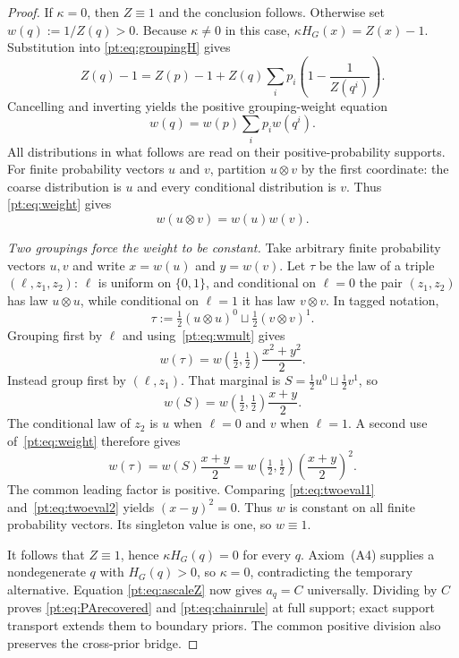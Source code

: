 \documentclass[11pt,a4paper]{article}
\theoremstyle{definition}
\newcommand{\1}{\mathbf 1}
\begin{document}
\begin{proof}
If $\kappa=0$, then $Z\equiv1$ and the conclusion follows.  Otherwise set
$w(q):=1/Z(q)>0$.  Because $\kappa\ne0$ in this case,
$\kappa H_G(x)=Z(x)-1$.  Substitution into
\eqref{pt:eq:groupingH} gives
\[
 Z(q)-1=Z(p)-1+
 Z(q)\sum_i p_i\left(1-\frac1{Z(q^i)}\right).
\]
Cancelling and inverting yields the positive grouping-weight equation
\begin{equation}
 w(q)=w(p)\sum_i p_iw(q^i).
\tag{W}\label{pt:eq:weight}
\end{equation}
All distributions in what follows are read on their positive-probability
supports.  For finite probability vectors $u$ and $v$, partition $u\otimes v$ by the
first coordinate: the coarse
distribution is $u$ and every conditional distribution is $v$.  Thus
\eqref{pt:eq:weight} gives
\begin{equation}
 w(u\otimes v)=w(u)w(v).
\tag{M}\label{pt:eq:wmult}
\end{equation}

\emph{Two groupings force the weight to be constant.}
Take arbitrary finite probability vectors $u,v$ and write
$x=w(u)$ and $y=w(v)$.  Let $\tau$ be the law of a triple
$(\ell,z_1,z_2)$: $\ell$ is uniform on $\{0,1\}$, and conditional on
$\ell=0$ the pair $(z_1,z_2)$ has law $u\otimes u$, while conditional on
$\ell=1$ it has law $v\otimes v$.  In tagged notation,
\[
 \tau:=\tfrac12(u\otimes u)^0\sqcup\tfrac12(v\otimes v)^1.
\]
Grouping first by $\ell$ and using~\eqref{pt:eq:wmult} gives
\begin{equation}
 w(\tau)=w(\tfrac12,\tfrac12)\frac{x^2+y^2}{2}.
\tag{E1}\label{pt:eq:twoeval1}
\end{equation}
Instead group first by $(\ell,z_1)$.  That marginal is
$S=\tfrac12u^0\sqcup\tfrac12v^1$, so
\[
 w(S)=w(\tfrac12,\tfrac12)\frac{x+y}{2}.
\]
The conditional law of $z_2$ is $u$ when $\ell=0$ and $v$ when $\ell=1$.
A second use of~\eqref{pt:eq:weight} therefore gives
\begin{equation}
 w(\tau)=w(S)\frac{x+y}{2}
 =w(\tfrac12,\tfrac12)\left(\frac{x+y}{2}\right)^2.
\tag{E2}\label{pt:eq:twoeval2}
\end{equation}
The common leading factor is positive.  Comparing
\eqref{pt:eq:twoeval1} and~\eqref{pt:eq:twoeval2} yields $(x-y)^2=0$.
Thus $w$ is constant on all finite probability vectors.  Its singleton value
is one, so $w\equiv1$.

It follows that $Z\equiv1$, hence $\kappa H_G(q)=0$ for every $q$.
Axiom~\textup{(A4)} supplies a nondegenerate $q$ with $H_G(q)>0$, so
$\kappa=0$, contradicting the temporary alternative.  Equation
\eqref{pt:eq:ascaleZ} now gives $a_q=C$ universally.
Dividing by $C$ proves \eqref{pt:eq:PArecovered} and
\eqref{pt:eq:chainrule} at full support; exact support transport extends
them to boundary priors.  The common positive division also preserves the
cross-prior bridge.
\end{proof}
\end{document}
